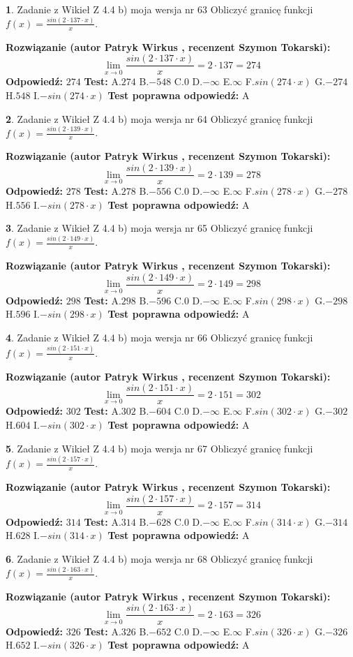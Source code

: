 \documentclass[12pt, a4paper]{article}
\theoremstyle{definition} %
\newtheorem{zad}{}
\newcommand{\zadStart}[1]{\begin{zad}#1\newline}
\newcommand{\zadStop}{\end{zad}}
\newcommand{\rozwStart}[2]{\noindent \textbf{Rozwiązanie (autor #1 , recenzent #2): }\newline}
\newcommand{\rozwStop}{\newline}
\newcommand{\odpStart}{\noindent \textbf{Odpowiedź:}\newline}
\newcommand{\odpStop}{\newline}
\newcommand{\testStart}{\noindent \textbf{Test:}\newline}
\newcommand{\testStop}{\newline}
\newcommand{\kluczStart}{\noindent \textbf{Test poprawna odpowiedź:}\newline}
\newcommand{\kluczStop}{\newline}
\begin{document}
\zadStart{Zadanie z Wikieł Z 4.4 b) moja wersja nr 63}
Obliczyć granicę funkcji $f(x)=\frac{sin(2 \cdot137\cdot x)}{x}$.
\zadStop
\rozwStart{Patryk Wirkus}{Szymon Tokarski}
$$\lim\limits_{x\to 0}\frac{sin(2 \cdot 137\cdot x)}{x}=
2 \cdot 137 = 274$$
\rozwStop
\odpStart
$274$
\odpStop
\testStart
A.$274$
B.$-548$
C.$0$
D.$-\infty$
E.$\infty$
F.$sin(274\cdot x)$
G.$-274$
H.$548$
I.$-sin(274\cdot x)$
\testStop
\kluczStart
A
\kluczStop



\zadStart{Zadanie z Wikieł Z 4.4 b) moja wersja nr 64}
Obliczyć granicę funkcji $f(x)=\frac{sin(2 \cdot139\cdot x)}{x}$.
\zadStop
\rozwStart{Patryk Wirkus}{Szymon Tokarski}
$$\lim\limits_{x\to 0}\frac{sin(2 \cdot 139\cdot x)}{x}=
2 \cdot 139 = 278$$
\rozwStop
\odpStart
$278$
\odpStop
\testStart
A.$278$
B.$-556$
C.$0$
D.$-\infty$
E.$\infty$
F.$sin(278\cdot x)$
G.$-278$
H.$556$
I.$-sin(278\cdot x)$
\testStop
\kluczStart
A
\kluczStop



\zadStart{Zadanie z Wikieł Z 4.4 b) moja wersja nr 65}
Obliczyć granicę funkcji $f(x)=\frac{sin(2 \cdot149\cdot x)}{x}$.
\zadStop
\rozwStart{Patryk Wirkus}{Szymon Tokarski}
$$\lim\limits_{x\to 0}\frac{sin(2 \cdot 149\cdot x)}{x}=
2 \cdot 149 = 298$$
\rozwStop
\odpStart
$298$
\odpStop
\testStart
A.$298$
B.$-596$
C.$0$
D.$-\infty$
E.$\infty$
F.$sin(298\cdot x)$
G.$-298$
H.$596$
I.$-sin(298\cdot x)$
\testStop
\kluczStart
A
\kluczStop



\zadStart{Zadanie z Wikieł Z 4.4 b) moja wersja nr 66}
Obliczyć granicę funkcji $f(x)=\frac{sin(2 \cdot151\cdot x)}{x}$.
\zadStop
\rozwStart{Patryk Wirkus}{Szymon Tokarski}
$$\lim\limits_{x\to 0}\frac{sin(2 \cdot 151\cdot x)}{x}=
2 \cdot 151 = 302$$
\rozwStop
\odpStart
$302$
\odpStop
\testStart
A.$302$
B.$-604$
C.$0$
D.$-\infty$
E.$\infty$
F.$sin(302\cdot x)$
G.$-302$
H.$604$
I.$-sin(302\cdot x)$
\testStop
\kluczStart
A
\kluczStop



\zadStart{Zadanie z Wikieł Z 4.4 b) moja wersja nr 67}
Obliczyć granicę funkcji $f(x)=\frac{sin(2 \cdot157\cdot x)}{x}$.
\zadStop
\rozwStart{Patryk Wirkus}{Szymon Tokarski}
$$\lim\limits_{x\to 0}\frac{sin(2 \cdot 157\cdot x)}{x}=
2 \cdot 157 = 314$$
\rozwStop
\odpStart
$314$
\odpStop
\testStart
A.$314$
B.$-628$
C.$0$
D.$-\infty$
E.$\infty$
F.$sin(314\cdot x)$
G.$-314$
H.$628$
I.$-sin(314\cdot x)$
\testStop
\kluczStart
A
\kluczStop



\zadStart{Zadanie z Wikieł Z 4.4 b) moja wersja nr 68}
Obliczyć granicę funkcji $f(x)=\frac{sin(2 \cdot163\cdot x)}{x}$.
\zadStop
\rozwStart{Patryk Wirkus}{Szymon Tokarski}
$$\lim\limits_{x\to 0}\frac{sin(2 \cdot 163\cdot x)}{x}=
2 \cdot 163 = 326$$
\rozwStop
\odpStart
$326$
\odpStop
\testStart
A.$326$
B.$-652$
C.$0$
D.$-\infty$
E.$\infty$
F.$sin(326\cdot x)$
G.$-326$
H.$652$
I.$-sin(326\cdot x)$
\testStop
\kluczStart
A
\kluczStop
\end{document}

